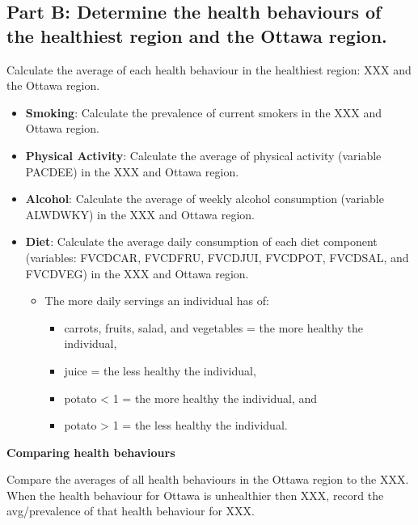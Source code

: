 \documentclass[]{book}
\providecommand{\tightlist}{%
  \setlength{\itemsep}{0pt}\setlength{\parskip}{0pt}}
\begin{document}
\hypertarget{part-b-determine-the-health-behaviours-of-the-healthiest-region-and-the-ottawa-region.}{%
\subsection{Part B: Determine the health behaviours of the healthiest region and the Ottawa region.}\label{part-b-determine-the-health-behaviours-of-the-healthiest-region-and-the-ottawa-region.}}

Calculate the average of each health behaviour in the healthiest region: XXX and the Ottawa region.

\begin{itemize}
\item
  \textbf{Smoking}: Calculate the prevalence of current smokers in the XXX and Ottawa region.
\item
  \textbf{Physical Activity}: Calculate the average of physical activity (variable PACDEE) in the XXX and Ottawa region.
\item
  \textbf{Alcohol}: Calculate the average of weekly alcohol consumption (variable ALWDWKY) in the XXX and Ottawa region.
\item
  \textbf{Diet}: Calculate the average daily consumption of each diet component (variables: FVCDCAR, FVCDFRU, FVCDJUI, FVCDPOT, FVCDSAL, and FVCDVEG) in the XXX and Ottawa region.

  \begin{itemize}
  \item
    The more daily servings an individual has of:

    \begin{itemize}
    \tightlist
    \item
      carrots, fruits, salad, and vegetables = the more healthy the individual,
    \item
      juice = the less healthy the individual,
    \item
      potato \textless{} 1 = the more healthy the individual, and
    \item
      potato \textgreater{} 1 = the less healthy the individual.
    \end{itemize}
  \end{itemize}
\end{itemize}

\textbf{Comparing health behaviours}

Compare the averages of all health behaviours in the Ottawa region to the XXX. When the health behaviour for Ottawa is unhealthier then XXX, record the avg/prevalence of that health behaviour for XXX.
\end{document}
